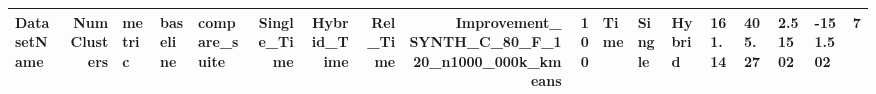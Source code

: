 \begin{tabular}{lrlllrrrrr}
\toprule
DatasetName & NumClusters & metric & baseline & compare_suite & Single_Time & Hybrid_Time & Rel_Time & Improvement_%
\midrule
SYNTH_C_80_F_120_n1000_000k_kmeans & 100 & Time & Single & Hybrid & 161.14 & 405.27 & 2.51502 & -151.502 & 7 \\
\bottomrule
\end{tabular}
